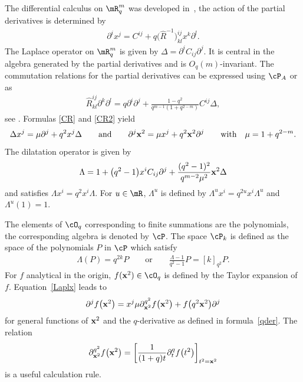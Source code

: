 The dif\/ferential calculus on $\mR^m_q$ was developed in~\cite{MR1138053, MR1182031}, the action of the partial derivatives is determined by
\begin{gather}
\label{defpart}
\partial^ix^j = C^{ij}+q\big(\hat{R}^{-1}\big)^{ij}_{kl}x^k\partial^l .
\end{gather}
The Laplace operator on $\mR^m_q$ is given by $\Delta=\partial^iC_{ij} \partial^j$. It is central in the algebra generated by the partial derivatives and is $O_q(m)$-invariant. The commutation relations for the partial derivatives can be expressed using $\cP_A$ or as
\begin{gather}
\label{Rxx}
\hat{R}^{ij}_{kl}\partial^k\partial^l = q\partial^i\partial^j+\frac{1-q^2}{q^{m-1}(1+q^{2-m})} C^{ij}\Delta,
\end{gather}
see \cite{MR1182031}. Formulas \eqref{CR} and \eqref{CR2} yield
\begin{gather}
\label{Laplx}
\Delta x^j=\mu\partial^j+q^2x^j\Delta \qquad \mbox{and} \qquad \partial^j\bold{x}^2=\mu x^j+q^2\bold{x}^2\partial^j\qquad  \mbox{with} \quad\mu=1+q^{2-m}.
\end{gather}
The dilatation operator is given by
\begin{gather}
\label{dil}
\Lambda=1+\big(q^2-1\big)x^iC_{ij}\partial^j+\frac{(q^2-1)^2}{q^{m-2}\mu^2}\bold{x}^2\Delta
\end{gather}
and satisf\/ies $\Lambda x^i=q^2x^i\Lambda $. For $u\in\mR$, $\Lambda^u$ is def\/ined by $\Lambda^u x^i=q^{2u}x^i\Lambda^u$ and $\Lambda^u(1)=1$.

The elements of $\cO_q$ corresponding to f\/inite summations are the polynomials, the correspon\-ding algebra is denoted by $\cP$. The space $\cP_k$ is def\/ined as the space of the polynomials $P$ in $\cP$ which satisfy
\begin{gather}
\label{propdil}
\Lambda (P)=q^{2k}P \qquad \mbox{or} \qquad \frac{\Lambda-1}{q^2-1}P=[k]_{q^2}P.
\end{gather}
For $f$ analytical in the origin, $f(\bold{x}^2)\in\cO_q$ is def\/ined by the Taylor expansion of $f$. Equa\-tion~\eqref{Laplx} leads to
\begin{gather}
\label{partialr}
\partial^jf\big(\bold{x}^2\big) = x^j\mu\partial_{\bold{x}^2}^{q^2}f\big(\bold{x}^2\big)+f\big(q^2\bold{x}^2\big)\partial^j
\end{gather}
for general functions of $\bold{x}^2$ and the $q$-derivative as def\/ined in formula~\eqref{qder}. The relation{\samepage
\begin{gather}
\label{berpx2}
\partial_{\bold{x}^2}^{q^2}f\big(\bold{x}^2\big) = \left[\frac{1}{(1+q)t}\partial_t^qf\big(t^2\big)\right]_{t^2=\bold{x}^2}
\end{gather}
is a useful calculation rule.}



